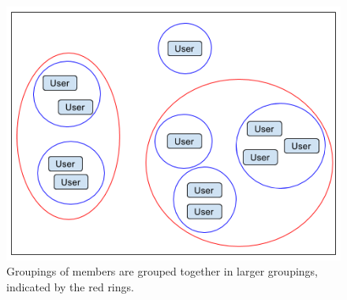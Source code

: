 \begin{figure}[H]
	\centering
	\includegraphics[scale=0.6]{graphics/Clustering_3.png}
	\caption{Groupings of members are grouped together in larger groupings, indicated by the red rings.}
	\label{fig:bg:clustering_3}
\end{figure}
